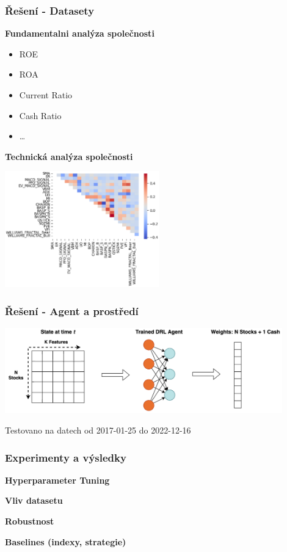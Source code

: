 \begin{frame}
    \frametitle{Řešení - Datasety}
    \begin{multicols}{2}
        \textbf{Fundamentalni analýza společnosti}
        \begin{itemize}
            \item ROE
            \item ROA
            \item Current Ratio
            \item Cash Ratio
            \item \ldots
        \end{itemize}
        \columnbreak
        \textbf{Technická analýza společnosti}
        \begin{center}
            \centering
            \includegraphics[width=0.5\textwidth]{img/corr}
        \end{center}
    \end{multicols}
\end{frame}

\begin{frame}
    \frametitle{Řešení - Agent a prostředí}

    \begin{center}
        \centering
        \includegraphics[width=0.9\textwidth]{img/env}
    \end{center}
\end{frame}

\begin{frame}
    Testovano na datech od 2017-01-25 do 2022-12-16
    \frametitle{Experimenty a výsledky}

    \textbf{Hyperparameter Tuning}

    \textbf{Vliv datasetu}

    \textbf{Robustnost}

    \textbf{Baselines (indexy, strategie)}

\end{frame}

